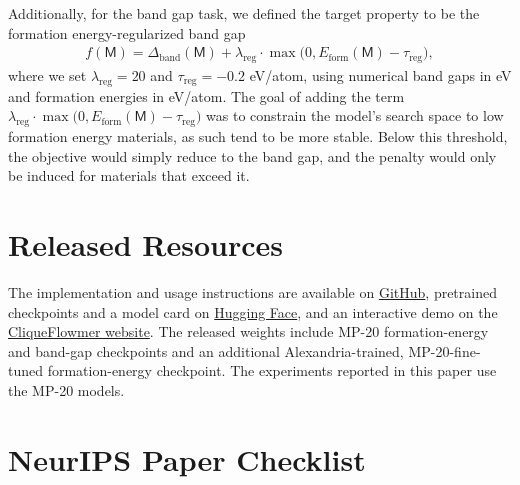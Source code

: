 \documentclass{article}
\theoremstyle{plain}
\theoremstyle{definition}
\theoremstyle{remark}
\begin{document}
Additionally, for the band gap task, we defined the target property to be the formation energy-regularized band gap
\begin{align}
    f(\mathsf{M}) = \Delta_{\text{band}}(\mathsf{M}) + \lambda_{\text{reg}} \cdot \max\big(0, E_{\text{form}}(\mathsf{M}) - \tau_{\text{reg}}\big),\nonumber 
\end{align}
where we set $\lambda_{\text{reg}}=20$ and $\tau_{\text{reg}}=-0.2$ eV/atom, using numerical band gaps in eV and formation energies in eV/atom. 
The goal of adding the term $\lambda_{\text{reg}} \cdot \max\big(0, E_{\text{form}}(\mathsf{M}) - \tau_{\text{reg}}\big)$ was to constrain the model's search space to low formation energy materials, as such tend to be more stable. 
Below this threshold, the objective would simply reduce to the band gap, and the penalty would only be induced for materials that exceed it.

\section{Released Resources}
\label{app:resources}
The implementation and usage instructions are available on \href{https://github.com/znowu/CliqueFlowmer}{GitHub}, pretrained checkpoints and a model card on \href{https://huggingface.co/iamkuba/CliqueFlowmer}{Hugging Face}, and an interactive demo on the \href{https://cliqueflowmer.znowu.workers.dev}{CliqueFlowmer website}.
The released weights include MP-20 formation-energy and band-gap checkpoints and an additional Alexandria-trained, MP-20-fine-tuned formation-energy checkpoint. The experiments reported in this paper use the MP-20 models.

\clearpage
\section*{NeurIPS Paper Checklist}


\end{document}
